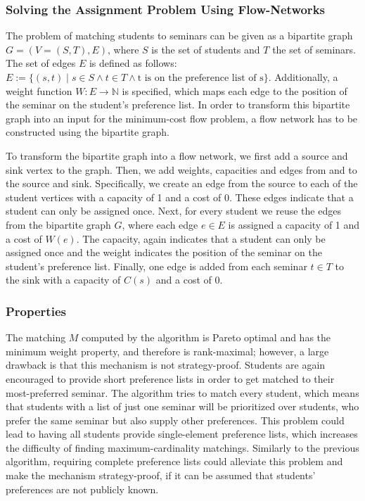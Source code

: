 \subsubsection{Solving the Assignment Problem Using Flow-Networks}
The problem of matching students to seminars can be given as a bipartite graph $G=(V=(S, T), E)$, where $S$ is the set of students and $T$ the set of seminars. The set of edges $E$ is defined as follows: $E:= \{(s, t) \mid s \in S \land t \in T \land \mbox{t is on the preference list of s}\}$. Additionally, a weight function $W: E \rightarrow  \mathbb{N}$ is specified, which maps each edge to the position of the seminar on the student's preference list. In order to transform this bipartite graph into an input for the minimum-cost flow problem, a flow network has to be constructed using the bipartite graph.

To transform the bipartite graph into a flow network, we first add a source and sink vertex to the graph. Then, we add weights, capacities and edges from and to the source and sink. Specifically, we create an edge from the source to each of the student vertices with a capacity of 1 and a cost of 0. These edges indicate that a student can only be assigned once. Next, for every student we reuse the edges from the bipartite graph $G$, where each edge $e \in E$ is assigned a capacity of 1 and a cost of $W(e)$. The capacity, again indicates that a student can only be assigned once and the weight indicates the position of the seminar on the student's preference list. Finally, one edge is added from each seminar $t \in T$ to the sink with a capacity of $C(s)$ and a cost of 0. 

\subsubsection{Properties}
The matching $M$ computed by the algorithm is Pareto optimal \cite{SngThesis} and has the minimum weight property, and therefore is rank-maximal;\cite{SngThesis} however, a large drawback is that this mechanism is not strategy-proof. Students are again encouraged to provide short preference lists in order to get matched to their most-preferred seminar. The algorithm tries to match every student, which means that students with a list of just one seminar will be prioritized over students, who prefer the same seminar but also supply other preferences. This problem could lead to having all students provide single-element preference lists, which increases the difficulty of finding maximum-cardinality matchings. Similarly to the previous algorithm, requiring complete preference lists could alleviate this problem and make the mechanism strategy-proof, if it can be assumed that students' preferences are not publicly known.

